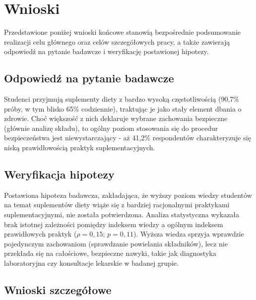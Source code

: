 \section{Wnioski}\label{Wnioski}

Przedstawione poniżej wnioski końcowe stanowią bezpośrednie podsumowanie realizacji celu głównego oraz celów szczegółowych pracy, a także zawierają odpowiedź na pytanie badawcze i weryfikację postawionej hipotezy.

\subsection{Odpowiedź na pytanie badawcze}

Studenci przyjmują suplementy diety z bardzo wysoką częstotliwością (90,7\% próby, w tym blisko 65\% codziennie), traktując je jako stały element dbania o zdrowie. Choć większość z nich deklaruje wybrane zachowania bezpieczne (głównie analizę składu), to ogólny poziom stosowania się do procedur bezpieczeństwa jest niewystarczający - aż 41,2\% respondentów charakteryzuje się niską prawidłowością praktyk suplementacyjnych.

\subsection{Weryfikacja hipotezy}

Postawiona hipoteza badawcza, zakładająca, że wyższy poziom wiedzy studentów na temat suplementów diety wiąże się z bardziej racjonalnymi praktykami suplementacyjnymi, nie została potwierdzona. Analiza statystyczna wykazała brak istotnej zależności pomiędzy indeksem wiedzy a ogólnym indeksem prawidłowych praktyk ($\rho = 0,15$; $p = 0,11$). Wyższa wiedza sprzyja wprawdzie pojedynczym zachowaniom (sprawdzanie powielania składników), lecz nie przekłada się na całościowe, bezpieczne nawyki, takie jak diagnostyka laboratoryjna czy konsultacje lekarskie w badanej grupie.

\subsection{Wnioski szczegółowe}

